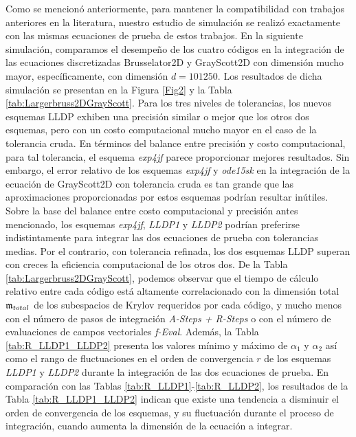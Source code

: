 Como se mencionó anteriormente, para mantener la compatibilidad con trabajos anteriores en la literatura, nuestro estudio de simulación se realizó exactamente con las mismas ecuaciones de prueba de estos trabajos. En la siguiente simulación, comparamos el desempeño de los cuatro códigos en la integración de las ecuaciones discretizadas Brusselator2D y GrayScott2D con dimensión mucho mayor, específicamente, con dimensión $d=101 250$. Los resultados de dicha simulación se presentan en la Figura \ref{Fig2} y la Tabla \ref{tab:Largerbruss2DGrayScott}. Para los tres niveles de tolerancias, los nuevos esquemas LLDP exhiben una precisión similar o mejor que los otros dos esquemas, pero con un costo computacional mucho mayor en el caso de la tolerancia cruda. En términos del balance entre precisión y costo computacional, para tal tolerancia, el esquema \emph{exp4jf} parece proporcionar mejores resultados. Sin embargo, el error relativo de los esquemas \emph{exp4jf} y \emph{ode15sk} en la integración de la ecuación de GrayScott2D con tolerancia cruda es tan grande que las aproximaciones proporcionadas por estos esquemas podrían resultar inútiles. Sobre la base del balance entre costo computacional y precisión antes mencionado, los esquemas \emph{exp4jf}, \emph{LLDP1} y \emph{LLDP2} podrían preferirse indistintamente para integrar las dos ecuaciones de prueba con tolerancias medias. Por el contrario, con tolerancia refinada, los dos esquemas LLDP superan con creces la eficiencia computacional de los otros dos. De la Tabla \ref{tab:Largerbruss2DGrayScott}, podemos observar que el tiempo de cálculo relativo entre cada código está altamente correlacionado con la dimensión total $\mathfrak{m}_{total}$ de los subespacios de Krylov requeridos por cada código, y mucho menos con el número de pasos de integración \textit{A-Steps + R-Steps} o con el número de evaluaciones de campos vectoriales \textit{f-Eval}. Además, la Tabla \ref{tab:R_LLDP1_LLDP2} presenta los valores mínimo y máximo de $\alpha _{1}$ y $\alpha _{2}$ así como el rango de fluctuaciones en el orden de convergencia $r$ de los esquemas \emph{LLDP1} y \emph{LLDP2} durante la integración de las dos ecuaciones de prueba. En comparación con las Tablas \ref{tab:R_LLDP1}-\ref{tab:R_LLDP2}, los resultados de la Tabla \ref{tab:R_LLDP1_LLDP2} indican que existe una tendencia a disminuir el orden de convergencia de los esquemas, y su fluctuación durante el proceso de integración, cuando aumenta la dimensión de la ecuación a integrar.

